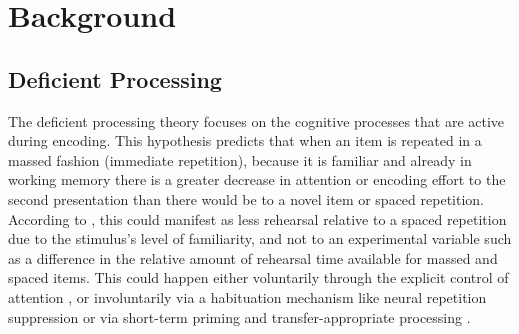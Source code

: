 
\section{Background}




\subsection{Deficient Processing}

The deficient processing theory focuses on the cognitive processes that are active during encoding.  This hypothesis predicts that when an item is repeated in a massed fashion (immediate repetition), because it is familiar and already in working memory there is a greater decrease in attention or encoding effort to the second presentation than there would be to a novel item or spaced repetition.  According to , this could manifest as less rehearsal relative to a spaced repetition due to the stimulus's level of familiarity, and not to an experimental variable such as a difference in the relative amount of rehearsal time available for massed and spaced items.  This could happen either voluntarily through the explicit control of attention \cite{Gree1989a}, or involuntarily via a habituation mechanism like neural repetition suppression \cite{CallSchw2010,Hint1974,VanSEtal2007,WagnEtal2000,XueEtal2011} or via short-term priming and transfer-appropriate processing \cite{Chal1993,MammEtal2002,RussEtal1998}.



